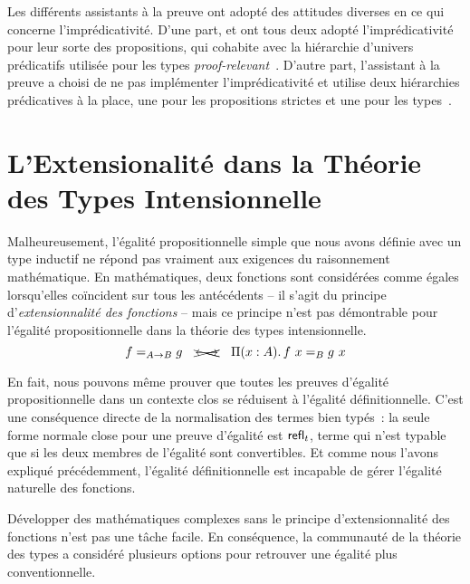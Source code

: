 Les différents assistants à la preuve ont adopté des attitudes diverses en ce qui 
concerne l'imprédicativité. D'une part, 
% 
% 
\Coq et \Lean ont tous deux adopté l'imprédicativité pour leur sorte des 
propositions, qui cohabite avec la hiérarchie d'univers prédicatifs utilisée 
pour les types \emph{proof-relevant}~.
% 
D'autre part, l'assistant à la preuve \Agda a choisi de ne pas implémenter
l'imprédicativité et utilise deux hiérarchies prédicatives à la place, une 
pour les propositions strictes et une pour les types~.

\section{L'Extensionalité dans la Théorie des Types Intensionnelle}

Malheureusement, l'égalité propositionnelle simple que nous avons définie avec un type inductif 
ne répond pas vraiment aux exigences du raisonnement mathématique. 
% 
En mathématiques, deux fonctions sont considérées comme égales lorsqu'elles 
coïncident sur tous les antécédents -- il s'agit du principe 
d'\emph{extensionnalité des fonctions} -- mais
% 
% 
ce principe n'est pas démontrable pour l'égalité propositionnelle dans 
la théorie des types intensionnelle.
\[
  \Indeq{A \to B}{f}{g} \quad \xcancel{\longleftrightarrow} \quad \Depfun{A}{\Indeq{B}{f\ x}{g\ x}}
\]

En fait, nous pouvons même prouver que toutes les preuves d'égalité 
propositionnelle dans un contexte clos se réduisent à l'égalité définitionnelle. 
% 
C'est une conséquence directe de la normalisation des termes bien typés~: 
la seule forme normale close pour une preuve d'égalité est \( \mathsf{refl}_{t} \), 
terme qui n'est typable que si les deux membres de l'égalité sont convertibles. 
% 
Et comme nous l'avons expliqué précédemment, l'égalité définitionnelle est 
incapable de gérer l'égalité naturelle des fonctions. 

Développer des mathématiques complexes sans le principe d'extensionnalité 
des fonctions n'est pas une tâche facile. En conséquence, la communauté de la 
théorie des types a considéré plusieurs options pour retrouver une égalité plus 
conventionnelle.

